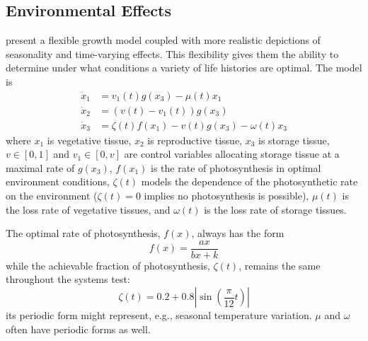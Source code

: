 \documentclass{article}
\begin{document}
\subsection{Environmental Effects}

\citet{mironchenko_optimal_2014} present a flexible growth model coupled with more realistic depictions of seasonality and time-varying effects. This flexibility gives them the ability to determine under what conditions a variety of life histories are optimal. The model is
\begin{equation}
\begin{aligned}
\dot x_1 &= v_1(t)g(x_3) - \mu(t) x_1                  \\
\dot x_2 &= \left(v(t)-v_1(t)\right)g(x_3)             \\
\dot x_3 &= \zeta(t)f(x_1) - v(t)g(x_3) -\omega(t)x_3
\end{aligned}
\end{equation}
where $x_1$ is vegetative tissue, $x_2$ is reproductive tissue, $x_3$ is storage tissue, $v\in[0,1]$ and $v_1\in[0,v]$ are control variables allocating storage tissue at a maximal rate of $g(x_3)$, $f(x_1)$ is the rate of photosynthesis in optimal environment conditions, $\zeta(t)$ models the dependence of the photosynthetic rate on the environment ($\zeta(t)=0$ implies no photosynthesis is possible), $\mu(t)$ is the loss rate of vegetative tissues, and $\omega(t)$ is the loss rate of storage tissues.

The optimal rate of photosynthesis, $f(x)$, always has the form
\begin{equation}
f(x) = \frac{ax}{bx+k}
\end{equation}
while the achievable fraction of photosynthesis, $\zeta(t)$, remains the same throughout the systems \citeauthor{mironchenko_optimal_2014} test:
\begin{equation}
\zeta(t) = 0.2 + 0.8 \left\lvert \sin \left(\frac{\pi}{12}t\right)\right\rvert
\end{equation}
its periodic form might represent, e.g., seasonal temperature variation. $\mu$ and $\omega$ often have periodic forms as well.
\end{document}
